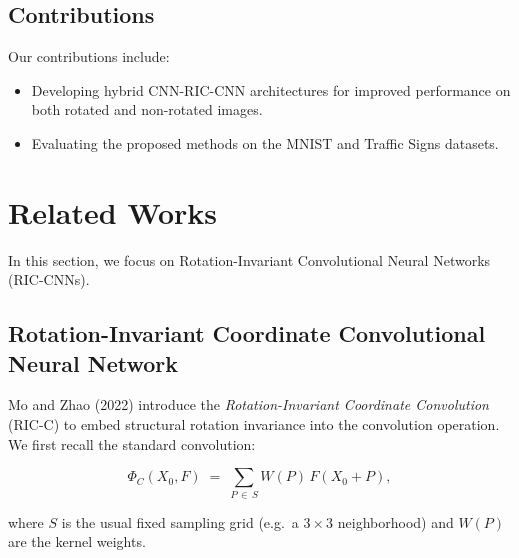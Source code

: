 \subsection{Contributions}
Our contributions include:
\begin{itemize}
    \item Developing hybrid CNN-RIC-CNN architectures for improved performance on both rotated and non-rotated images.
    \item Evaluating the proposed methods on the MNIST and Traffic Signs datasets.

\end{itemize}


\section{Related Works}
\label{sec:related}

In this section, we focus on Rotation-Invariant Convolutional Neural Networks (RIC-CNNs).

\subsection{Rotation-Invariant Coordinate Convolutional Neural Network}

Mo and Zhao (2022) introduce the \emph{Rotation-Invariant Coordinate Convolution} (RIC-C) to embed structural rotation invariance into the convolution operation.  We first recall the standard convolution:

\begin{equation}
\Phi_{C}(X_0, F)
\;=\;
\sum_{P \,\in\, S} W(P)\,F(X_0 + P),
\label{eq:std_conv}
\end{equation}

\noindent
where \(S\) is the usual fixed sampling grid (e.g.\ a \(3\times3\) neighborhood) and \(W(P)\) are the kernel weights.

